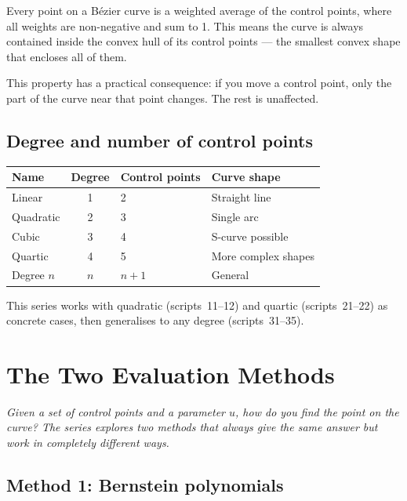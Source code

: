 \documentclass[12pt, a4paper]{article}
\begin{document}
Every point on a B\'ezier curve is a weighted average of
the control points, where all weights are non-negative
and sum to 1.
This means the curve is always contained inside the
convex hull of its control points --- the smallest
convex shape that encloses all of them.

This property has a practical consequence: if you move
a control point, only the part of the curve near that
point changes.
The rest is unaffected.

\subsection{Degree and number of control points}

\begin{center}
\begin{tabular}{lcll}
\toprule
Name & Degree & Control points & Curve shape \\
\midrule
Linear    & 1 & 2 & Straight line \\
Quadratic & 2 & 3 & Single arc \\
Cubic     & 3 & 4 & S-curve possible \\
Quartic   & 4 & 5 & More complex shapes \\
Degree $n$ & $n$ & $n+1$ & General \\
\bottomrule
\end{tabular}
\end{center}

This series works with quadratic (scripts~11--12) and
quartic (scripts~21--22) as concrete cases, then
generalises to any degree (scripts~31--35).


\section{The Two Evaluation Methods}

\textit{Given a set of control points and a parameter $u$,
how do you find the point on the curve?
The series explores two methods that always give the same
answer but work in completely different ways.}

\subsection{Method 1: Bernstein polynomials}
\end{document}
